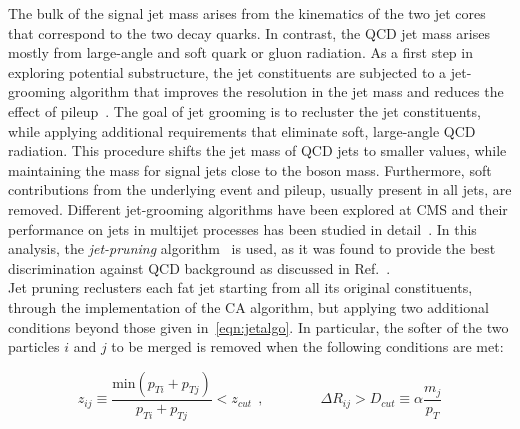 The bulk of the signal jet mass arises from the kinematics of the two jet cores that correspond to the two decay quarks. In contrast, the QCD jet mass arises mostly from large-angle and soft quark or gluon radiation.
As a first step in exploring potential substructure, the jet constituents are subjected to a jet-grooming algorithm that improves the resolution in the jet mass and reduces the effect of pileup~\cite{Chatrchyan:2013vbb,Khachatryan:2014vla}. The goal of jet grooming is to recluster the jet constituents, while applying additional requirements that eliminate soft, large-angle QCD radiation. This procedure shifts the jet mass of QCD jets to smaller values, while maintaining the mass for signal jets close to the boson mass. Furthermore, soft contributions from the underlying event and pileup, usually present in all jets, are removed.
Different jet-grooming algorithms have been explored at CMS and their performance on jets in multijet processes has been studied in detail~\cite{Chatrchyan:2013vbb,Khachatryan:2014vla}. In this analysis, the \emph{jet-pruning} algorithm~\cite{jetpruning1,Ellis:2009me} is used, as it was found to provide the best discrimination against QCD background as discussed in Ref.~\cite{Chatrchyan:2013vbb,Khachatryan:2014vla}.\\

Jet pruning reclusters each fat jet starting from all its original constituents, through the implementation of the CA algorithm, but applying two additional conditions beyond those given in~\ref{eqn:jetalgo}. In particular, the softer of the two particles $i$ and $j$ to be merged is removed when the following conditions are met:

\begin{equation}
z_{ij} \equiv \frac{\mathrm{min}(p_{Ti} + p_{Tj})}{p_{Ti} + p_{Tj}} < z_{cut}\:\:,
\quad\quad\quad\quad
\Delta R_{ij} > D_{cut} \equiv \alpha\frac{m_j}{p_T}
\end{equation}

